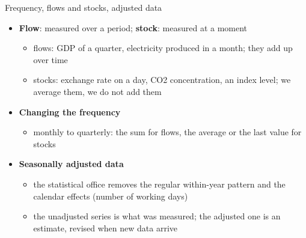 \begin{frame}{Frequency, flows and stocks, adjusted data}
\itemsize{\small}
\begin{itemize}
    \item \textbf{Flow}: measured over a period; \textbf{stock}: measured at a moment
    \begin{itemize}
        \item flows: GDP of a quarter, electricity produced in a month; they add up over time
        \item stocks: exchange rate on a day, CO2 concentration, an index level; we average them, we do not add them
    \end{itemize}
    \item \textbf{Changing the frequency}
    \begin{itemize}
        \item monthly to quarterly: the sum for flows, the average or the last value for stocks
    \end{itemize}
    \item \textbf{Seasonally adjusted data}
    \begin{itemize}
        \item the statistical office removes the regular within-year pattern and the calendar effects (number of working days)
        \item the unadjusted series is what was measured; the adjusted one is an estimate, revised when new data arrive
    \end{itemize}
\end{itemize}
\end{frame}

